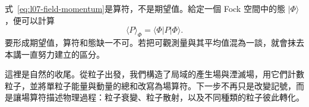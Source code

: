 式~\eqref{eq:l07-field-momentum}是算符，不是期望值。給定一個 Fock 空間中的態 \(|\Phi\rangle\)，便可以計算
\begin{equation}
\langle P\rangle_\Phi=\langle\Phi|P|\Phi\rangle.
\end{equation}
要形成期望值，算符和態缺一不可。若把可觀測量與其平均值混為一談，就會抹去本講一直努力建立的區分。

\begin{classroomqa}
\end{classroomqa}

這裡是自然的收尾。從粒子出發，我們構造了局域的產生場與湮滅場，用它們計數粒子，並將單粒子能量與動量的總和改寫為場算符。下一步不再只是改變記號，而是讓場算符描述物理過程：粒子衰變、粒子散射，以及不同種類的粒子彼此轉化。
